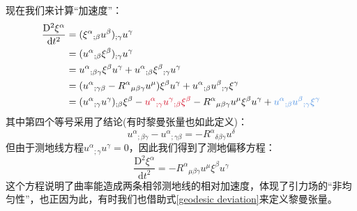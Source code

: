 \documentclass[hyperref, UTF8, a4paper]{ctexart}
\begin{document}
现在我们来计算“加速度”：
\begin{equation*}
	\begin{aligned}
		\frac{\mathrm{D}^{2} \xi ^{\alpha }}{\mathrm{d} t^{2}} & =(\xi ^{\alpha }{}_{;\beta } u^{\beta } )_{;\gamma } u^{\gamma }\\
		& =(u^{\alpha }{}_{;\beta } \xi ^{\beta } )_{;\gamma } u^{\gamma }\\
		& =u^{\alpha }{}_{;\beta \gamma } \xi ^{\beta } u^{\gamma } +u^{\alpha }{}_{;\beta } \xi ^{\beta }{}_{;\gamma } u^{\gamma }\\
		& =(u^{\alpha }{}_{;\gamma \beta } -R^{\alpha }{}_{\mu \beta \gamma } u^{\mu } )\xi ^{\beta } u^{\gamma } +u^{\alpha }{}_{;\beta } u^{\beta }{}_{;\gamma } \xi ^{\gamma }\\
		& =(u^{\alpha }{}_{;\gamma } u^{\gamma } )_{;\beta } \xi ^{\beta } -\textcolor[rgb]{0.82,0.01,0.11}{u^{\alpha }{}_{;\gamma } u^{\gamma }{}_{;\beta } \xi ^{\beta }} -R^{\alpha }{}_{\mu \beta \gamma } u^{\mu } \xi ^{\beta } u^{\gamma } +\textcolor[rgb]{0.29,0.56,0.89}{u^{\alpha }{}_{;\beta } u^{\beta }{}_{;\gamma } \xi ^{\gamma }}
	\end{aligned}
\end{equation*}
其中第四个等号采用了结论(有时黎曼张量也如此定义)：
\begin{equation*}
	u^{\alpha }{}_{;\beta \gamma } -u^{\alpha }{}_{;\gamma \beta } =-R^{\alpha }{}_{\delta \beta \gamma } u^{\delta }
\end{equation*}
但由于测地线方程$u^{\alpha }{}_{;\gamma } u^{\gamma } =0$，因此我们得到了测地偏移方程：
\begin{equation}
	\boxed{\frac{\mathrm{D}^{2} \xi ^{\alpha }}{\mathrm{d} t^{2}} =-R^{\alpha }{}_{\mu \beta \gamma } u^{\mu } \xi ^{\beta } u^{\gamma }}
	\label{geodesic deviation}
\end{equation}
这个方程说明了曲率能造成两条相邻测地线的相对加速度，体现了引力场的“非均匀性”，也正因为此，有时我们也借助式\eqref{geodesic deviation}来定义黎曼张量。
\end{document}
